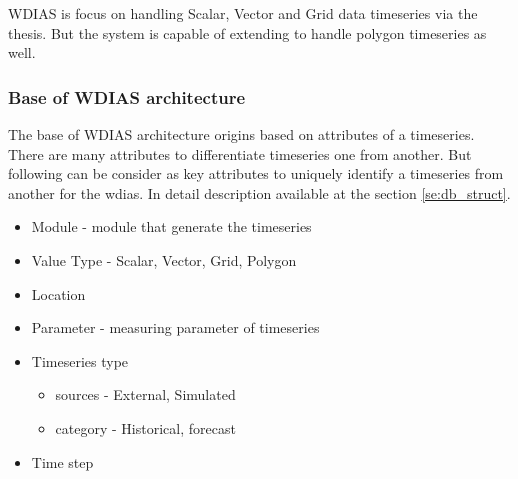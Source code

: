 WDIAS is focus on handling Scalar, Vector and Grid data timeseries via the thesis. But the system is capable of extending to handle polygon timeseries as well.

\subsubsection{Base of WDIAS architecture}
The base of WDIAS architecture origins based on attributes of a timeseries. There are many attributes to differentiate timeseries one from another. But following can be consider as key attributes to uniquely identify a timeseries from another for the \acrshort{wdias}. In detail description available at the section \ref{se:db_struct}.
\begin{itemize}
    \item Module - module that generate the timeseries
    \item Value Type - Scalar, Vector, Grid, Polygon
    \item Location 
    \item Parameter - measuring parameter of timeseries
    \item Timeseries type
    \begin{itemize}
        \item sources - External, Simulated
        \item category - Historical, forecast
    \end{itemize}
    \item Time step
\end{itemize}

